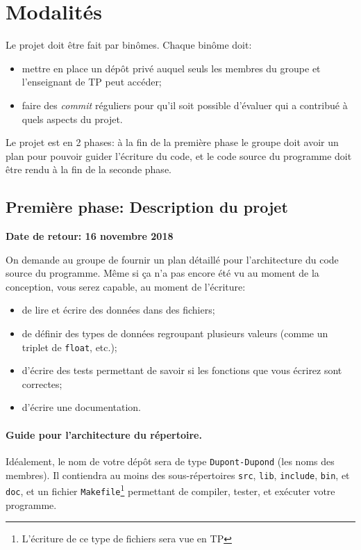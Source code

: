 \documentclass[a4paper]{article}
\begin{document}
\section{Modalit{\'e}s}

Le projet doit être fait par binômes. Chaque binôme doit:
\begin{itemize}
\item mettre en place un dépôt privé auquel seuls les membres du groupe
  et l'enseignant de TP peut accéder;
\item faire des \emph{commit} réguliers pour qu'il soit possible
  d'évaluer qui a contribué à quels aspects du projet.
\end{itemize}

Le projet est en 2 phases: à la fin de la première phase le groupe
doit avoir un plan pour pouvoir guider l'écriture du code, et le code
source du programme doit être rendu à la fin de la seconde phase.

\subsection{Première phase: Description du projet}

\begin{center}
  \bf Date de retour:  16 novembre 2018
\end{center}

On demande au groupe de fournir un plan détaillé pour l'architecture
du code source du programme. Même si ça n'a pas encore été vu au
moment de la conception, vous serez capable, au moment de l'écriture:
\begin{itemize}
\item de lire et écrire des données dans des fichiers;
\item de définir des types de données regroupant plusieurs valeurs
  (comme un triplet de \texttt{float}, etc.);
\item d'écrire des tests permettant de savoir si les fonctions que
  vous écrirez sont correctes;
\item d'écrire une documentation.
\end{itemize}

\paragraph{Guide pour l'architecture du répertoire.}
Idéalement, le nom de votre dépôt sera de type \texttt{Dupont-Dupond}
(les noms des membres). Il contiendra au moins des sous-répertoires
\texttt{src}, \texttt{lib}, \texttt{include}, \texttt{bin}, et
\texttt{doc}, et un fichier \texttt{Makefile}\footnote{L'écriture de
  ce type de fichiers sera vue en TP} permettant de compiler, tester,
et exécuter votre programme. 
\end{document}
